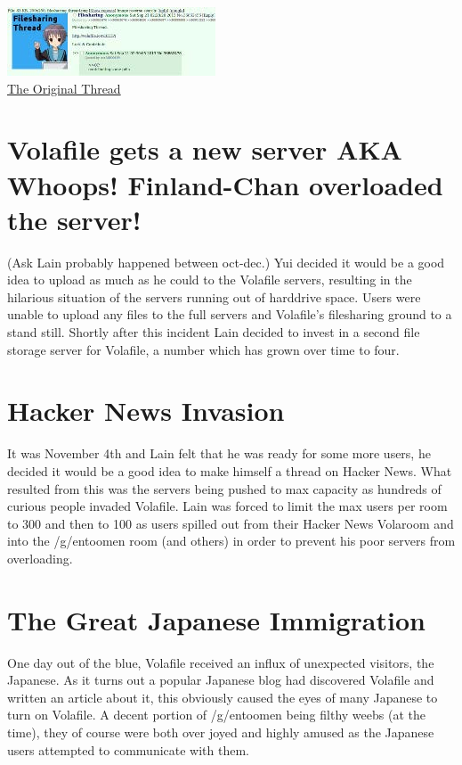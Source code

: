 \documentclass[12pt]{report}
\begin{document}
{		
\begin{image}
	\flushright
		\includegraphics[scale=0.25]{VolafileOrigTechnologyPost.jpg}\\
		\href{http://archive.rebeccablacktech.com/g/thread/S36862456}{The Original Thread}
		\label{fig:Never Forget}
\end{image}



\section[Volafile gets a new server]{Volafile gets a new server AKA \\ Whoops! Finland-Chan overloaded the server!}
(Ask Lain probably happened between oct-dec.) Yui decided it would be a good idea to upload as much as he could to the Volafile servers, resulting in the hilarious situation of the servers running out of harddrive space. Users were unable to upload any files to the full servers and Volafile's filesharing ground to a stand still. Shortly after this incident Lain decided to invest in a second file storage server for Volafile, a number which has grown over time to four.
\vfill
\pagebreak
\section{Hacker News Invasion}
It was November 4th and Lain felt that he was ready for some more users, he decided it would be a good idea to make himself a thread on Hacker News\footnotemark . 
What resulted from this was the servers being pushed to max capacity as hundreds of curious people invaded Volafile. Lain was forced to limit the max users per room to 300 and then to 100 as users spilled out from their Hacker News Volaroom and into the /g/entoomen room (and others) in order to prevent his poor servers from overloading.

\section{The Great Japanese Immigration}
	One day out of the blue, Volafile received an influx of unexpected visitors, the Japanese. As it turns out a popular Japanese blog had discovered Volafile and written an article about it, this obviously caused the eyes of many Japanese to turn on Volafile. A decent portion of /g/entoomen being filthy weebs (at the time), they of course were both over joyed and highly amused as the Japanese users attempted to communicate with them. %

}
\end{document}
